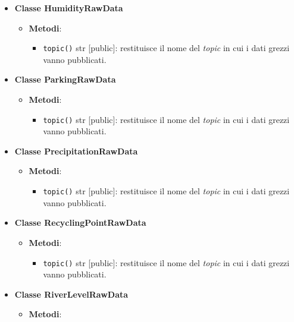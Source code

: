 \begin{itemize}
	\item \textbf{Classe HumidityRawData}
	      \begin{itemize}
		      \item \textbf{Metodi}:
		            \begin{itemize}
			            \item \texttt{topic()} str [public]: restituisce il nome del \textit{topic} in cui i dati grezzi vanno pubblicati.
		            \end{itemize}
	      \end{itemize}
	\item \textbf{Classe ParkingRawData}
	      \begin{itemize}
		      \item \textbf{Metodi}:
		            \begin{itemize}
			            \item \texttt{topic()} str [public]: restituisce il nome del \textit{topic} in cui i dati grezzi vanno pubblicati.
		            \end{itemize}
	      \end{itemize}
	\item \textbf{Classe PrecipitationRawData}
	      \begin{itemize}
		      \item \textbf{Metodi}:
		            \begin{itemize}
			            \item \texttt{topic()} str [public]: restituisce il nome del \textit{topic} in cui i dati grezzi vanno pubblicati.
		            \end{itemize}
	      \end{itemize}
	\item \textbf{Classe RecyclingPointRawData}
	      \begin{itemize}
		      \item \textbf{Metodi}:
		            \begin{itemize}
			            \item \texttt{topic()} str [public]: restituisce il nome del \textit{topic} in cui i dati grezzi vanno pubblicati.
		            \end{itemize}
	      \end{itemize}
	\item \textbf{Classe RiverLevelRawData}
	      \begin{itemize}
		      \item \textbf{Metodi}:
		            \begin{itemize}

\end{itemize}
\end{itemize}
\end{itemize}
